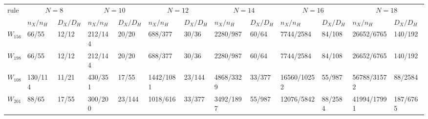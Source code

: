 \begin{tabular}{lllllllllllll}
\toprule
rule & \multicolumn{2}{c}{$N=8$} & \multicolumn{2}{c}{$N=10$} & \multicolumn{2}{c}{$N=12$} & \multicolumn{2}{c}{$N=14$} & \multicolumn{2}{c}{$N=16$} & \multicolumn{2}{c}{$N=18$} \\
 & $n_X/n_H$ & $D_X/D_H$ & $n_X/n_H$ & $D_X/D_H$ & $n_X/n_H$ & $D_X/D_H$ & $n_X/n_H$ & $D_X/D_H$ & $n_X/n_H$ & $D_X/D_H$ & $n_X/n_H$ & $D_X/D_H$ \\
\midrule
$W_{156}$ & 66/55 & 12/12 & 212/144 & 20/20 & 688/377 & 30/36 & 2280/987 & 60/64 & 7744/2584 & 84/108 & 26652/6765 & 140/192 \\
$W_{198}$ & 66/55 & 12/12 & 212/144 & 20/20 & 688/377 & 30/36 & 2280/987 & 60/64 & 7744/2584 & 84/108 & 26652/6765 & 140/192 \\
$W_{108}$ & 130/114 & 11/21 & 430/351 & 17/55 & 1442/1081 & 23/144 & 4868/3329 & 33/377 & 16560/10252 & 55/987 & 56788/31572 & 88/2584 \\
$W_{201}$ & 88/65 & 17/55 & 300/200 & 23/144 & 1018/616 & 33/377 & 3492/1897 & 55/987 & 12076/5842 & 88/2584 & 41994/17991 & 187/6765 \\
\bottomrule
\end{tabular}
